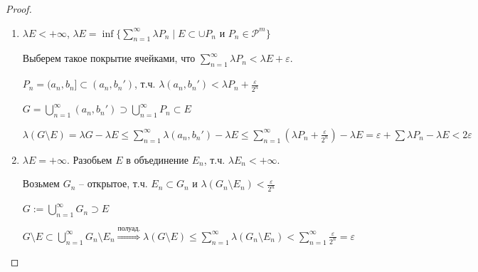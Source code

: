 \begin{proof}~
    \begin{enumerate}
        \item $\lambda E < +\infty$, $\lambda E =\inf \{ \sum\limits_{n=1}^\infty \lambda P_n \mid E\subset \cup P_n\text{ и } P_n\in \mathcal{P}^m\}$
        
        Выберем такое покрытие ячейками, что $\sum\limits_{n=1}^\infty \lambda P_n<\lambda E + \varepsilon$.

        $P_n= (a_n, b_n]\subset (a_n, b_n')$, т.ч. $\lambda (a_n, b_n')< \lambda P_n + \frac{\varepsilon}{2^n}$

        $G=\bigcup\limits_{n=1}^\infty (a_n, b_n')\supset \bigcup\limits_{n=1}^\infty P_n \subset E$

        $\lambda (G\setminus E) = \lambda G - \lambda E \leq \sum\limits_{n=1}^\infty \lambda (a_n, b_n') - \lambda E
        \leq \sum\limits_{n=1}^\infty (\lambda P_n + \frac{\varepsilon}{2^n}) - \lambda E = \varepsilon + \sum \lambda P_n - \lambda E < 2\varepsilon$

        \item $\lambda E = +\infty$. Разобьем $E$ в объединение $E_n$, т.ч. $\lambda E_n <+\infty$.

        Возьмем $G_n$ – открытое, т.ч. $E_n\subset G_n$ и $\lambda (G_n \setminus E_n) < \frac{\varepsilon}{2^n}$

        $G:= \bigcup\limits_{n=1}^\infty G_n \supset E$

        $G\setminus E \subset \bigcup\limits_{n=1}^\infty G_n \setminus E_n\overset{\text{полуад.}}{\Rightarrow} \lambda (G\setminus E)\leq \sum\limits_{n=1}^\infty\lambda (G_n \setminus E_n)< 
        \sum\limits_{n=1}^\infty \frac{\varepsilon}{2^n}=\varepsilon$
    \end{enumerate}
\end{proof}

